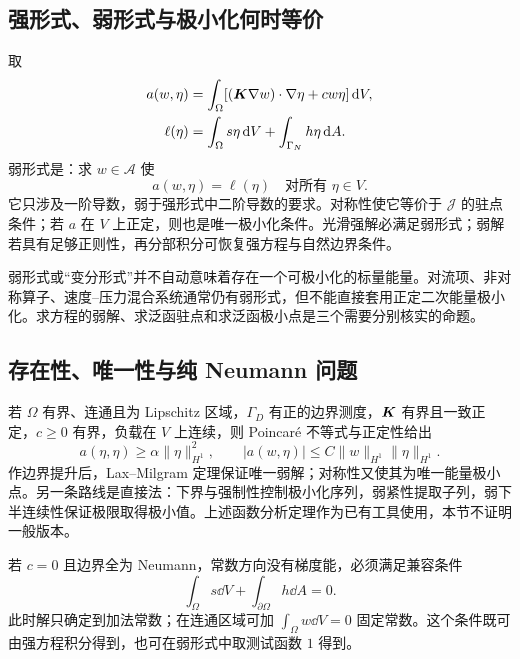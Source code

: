 \subsection{强形式、弱形式与极小化何时等价}

取
\begin{align}
 a(w,\eta)&=\int_\Omega[(\bm{K}\nabla w)\cdot\nabla\eta+cw\eta]\,\mathrm d V,\\
 \ell(\eta)&=\int_\Omega s\eta\,\mathrm d V+\int_{\Gamma_N}h\eta\,\mathrm d A.
\end{align}
弱形式是：求 $w\in\mathcal A$ 使
\begin{equation}
 \boxed{a(w,\eta)=\ell(\eta)\quad\text{对所有 }\eta\in V.}
 \label{eq:weak-abstract}
\end{equation}
它只涉及一阶导数，弱于强形式中二阶导数的要求。对称性使它等价于 $\mathcal J$ 的驻点条件；若 $a$ 在 $V$ 上正定，则也是唯一极小化条件。光滑强解必满足弱形式；弱解若具有足够正则性，再分部积分可恢复强方程与自然边界条件。

\begin{warningbox}
弱形式或“变分形式”并不自动意味着存在一个可极小化的标量能量。对流项、非对称算子、速度--压力混合系统通常仍有弱形式，但不能直接套用正定二次能量极小化。求方程的弱解、求泛函驻点和求泛函极小点是三个需要分别核实的命题。
\end{warningbox}

\subsection{存在性、唯一性与纯 Neumann 问题}

若 $\Omega$ 有界、连通且为 Lipschitz 区域，$\Gamma_D$ 有正的边界测度，$\bm{K}$ 有界且一致正定，$c\ge0$ 有界，负载在 $V$ 上连续，则 Poincar\'e 不等式与正定性给出
\begin{equation}
 a(\eta,\eta)\ge\alpha\|\eta\|_{H^1}^2,
 \qquad |a(w,\eta)|\le C\|w\|_{H^1}\|\eta\|_{H^1}.
\end{equation}
作边界提升后，Lax--Milgram 定理保证唯一弱解；对称性又使其为唯一能量极小点。另一条路线是直接法：下界与强制性控制极小化序列，弱紧性提取子列，弱下半连续性保证极限取得极小值。上述函数分析定理作为已有工具使用，本节不证明一般版本。

若 $c=0$ 且边界全为 Neumann，常数方向没有梯度能，必须满足兼容条件
\begin{equation}
 \int_\Omega s\dd V+\int_{\partial\Omega}h\dd A=0.
\end{equation}
此时解只确定到加法常数；在连通区域可加 $\int_\Omega w\dd V=0$ 固定常数。这个条件既可由强方程积分得到，也可在弱形式中取测试函数 $1$ 得到。

